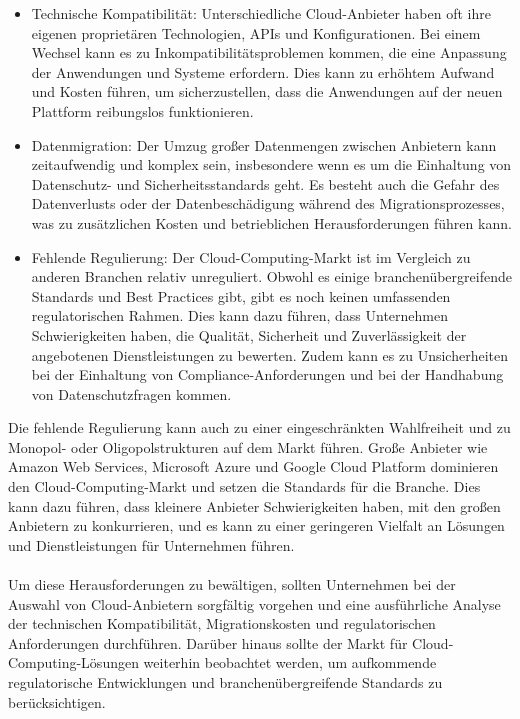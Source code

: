 \documentclass[../vs-script-first-v01.tex]{subfiles}
\begin{document}
\begin{itemize}
\item Technische Kompatibilität: Unterschiedliche Cloud-Anbieter haben oft ihre eigenen proprietären Technologien, APIs und Konfigurationen. Bei einem Wechsel kann es zu Inkompatibilitätsproblemen kommen, die eine Anpassung der Anwendungen und Systeme erfordern. Dies kann zu erhöhtem Aufwand und Kosten führen, um sicherzustellen, dass die Anwendungen auf der neuen Plattform reibungslos funktionieren.

\item Datenmigration: Der Umzug großer Datenmengen zwischen Anbietern kann zeitaufwendig und komplex sein, insbesondere wenn es um die Einhaltung von Datenschutz- und Sicherheitsstandards geht. Es besteht auch die Gefahr des Datenverlusts oder der Datenbeschädigung während des Migrationsprozesses, was zu zusätzlichen Kosten und betrieblichen Herausforderungen führen kann.

\item Fehlende Regulierung: Der Cloud-Computing-Markt ist im Vergleich zu anderen Branchen relativ unreguliert. Obwohl es einige branchenübergreifende Standards und Best Practices gibt, gibt es noch keinen umfassenden regulatorischen Rahmen. Dies kann dazu führen, dass Unternehmen Schwierigkeiten haben, die Qualität, Sicherheit und Zuverlässigkeit der angebotenen Dienstleistungen zu bewerten. Zudem kann es zu Unsicherheiten bei der Einhaltung von Compliance-Anforderungen und bei der Handhabung von Datenschutzfragen kommen.
\end{itemize}
Die fehlende Regulierung kann auch zu einer eingeschränkten Wahlfreiheit und zu Monopol- oder Oligopolstrukturen auf dem Markt führen. Große Anbieter wie Amazon Web Services, Microsoft Azure und Google Cloud Platform dominieren den Cloud-Computing-Markt und setzen die Standards für die Branche. Dies kann dazu führen, dass kleinere Anbieter Schwierigkeiten haben, mit den großen Anbietern zu konkurrieren, und es kann zu einer geringeren Vielfalt an Lösungen und Dienstleistungen für Unternehmen führen.
\\\\
Um diese Herausforderungen zu bewältigen, sollten Unternehmen bei der Auswahl von Cloud-Anbietern sorgfältig vorgehen und eine ausführliche Analyse der technischen Kompatibilität, Migrationskosten und regulatorischen Anforderungen durchführen. Darüber hinaus sollte der Markt für Cloud-Computing-Lösungen weiterhin beobachtet werden, um aufkommende regulatorische Entwicklungen und branchenübergreifende Standards zu berücksichtigen.
\end{document}
